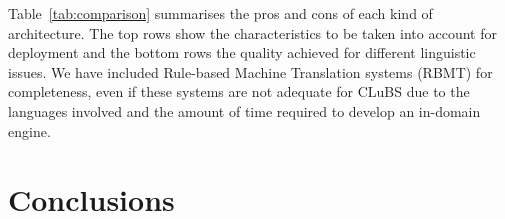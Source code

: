 \documentclass[a4paper,11pt]{article}
\begin{document}
Table~\ref{tab:comparison} summarises the pros and cons of each kind of architecture. The top rows show  the characteristics to be taken into account for deployment and the bottom rows the quality achieved for different linguistic issues. We have included Rule-based Machine Translation systems (RBMT) for completeness, even if these systems are not adequate for CLuBS due to the languages involved and the amount of time required to develop an in-domain engine.

% 




\section{Conclusions}
\label{s:conclusions}


%
%
% 
% 
\end{document}
